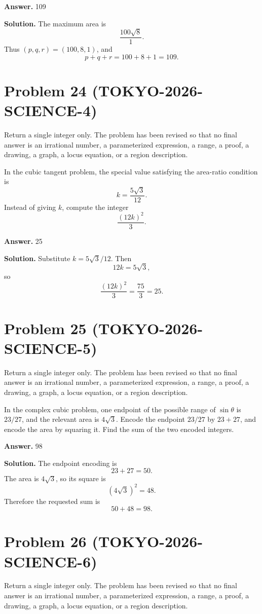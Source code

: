 \documentclass[11pt]{article}
\begin{document}
\textbf{Answer.} 109


\textbf{Solution.}
The maximum area is
\[
\frac{100\sqrt8}{1}.
\]
Thus \((p,q,r)=(100,8,1)\), and
\[
p+q+r=100+8+1=109.
\]


\section*{Problem 24 (TOKYO-2026-SCIENCE-4)}

Return a single integer only. The problem has been revised so that no final answer is an irrational number, a parameterized expression, a range, a proof, a drawing, a graph, a locus equation, or a region description.

In the cubic tangent problem, the special value satisfying the area-ratio
condition is
\[
k=\frac{5\sqrt3}{12}.
\]
Instead of giving \(k\), compute the integer
\[
\frac{(12k)^2}{3}.
\]


\textbf{Answer.} 25


\textbf{Solution.}
Substitute \(k=5\sqrt3/12\). Then
\[
12k=5\sqrt3,
\]
so
\[
\frac{(12k)^2}{3}=\frac{75}{3}=25.
\]


\section*{Problem 25 (TOKYO-2026-SCIENCE-5)}

Return a single integer only. The problem has been revised so that no final answer is an irrational number, a parameterized expression, a range, a proof, a drawing, a graph, a locus equation, or a region description.

In the complex cubic problem, one endpoint of the possible range of
\(\sin\theta\) is \(23/27\), and the relevant area is \(4\sqrt3\). Encode the
endpoint \(23/27\) by \(23+27\), and encode the area by squaring it. Find the
sum of the two encoded integers.


\textbf{Answer.} 98


\textbf{Solution.}
The endpoint encoding is
\[
23+27=50.
\]
The area is \(4\sqrt3\), so its square is
\[
(4\sqrt3)^2=48.
\]
Therefore the requested sum is
\[
50+48=98.
\]


\section*{Problem 26 (TOKYO-2026-SCIENCE-6)}

Return a single integer only. The problem has been revised so that no final answer is an irrational number, a parameterized expression, a range, a proof, a drawing, a graph, a locus equation, or a region description.
\end{document}
